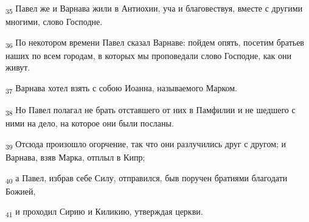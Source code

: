 \begin{tcolorbox}
\textsubscript{35} Павел же и Варнава жили в Антиохии, уча и благовествуя, вместе с другими многими, слово Господне.
\end{tcolorbox}
\begin{tcolorbox}
\textsubscript{36} По некотором времени Павел сказал Варнаве: пойдем опять, посетим братьев наших по всем городам, в которых мы проповедали слово Господне, как они живут.
\end{tcolorbox}
\begin{tcolorbox}
\textsubscript{37} Варнава хотел взять с собою Иоанна, называемого Марком.
\end{tcolorbox}
\begin{tcolorbox}
\textsubscript{38} Но Павел полагал не брать отставшего от них в Памфилии и не шедшего с ними на дело, на которое они были посланы.
\end{tcolorbox}
\begin{tcolorbox}
\textsubscript{39} Отсюда произошло огорчение, так что они разлучились друг с другом; и Варнава, взяв Марка, отплыл в Кипр;
\end{tcolorbox}
\begin{tcolorbox}
\textsubscript{40} а Павел, избрав себе Силу, отправился, быв поручен братиями благодати Божией,
\end{tcolorbox}
\begin{tcolorbox}
\textsubscript{41} и проходил Сирию и Киликию, утверждая церкви.
\end{tcolorbox}
